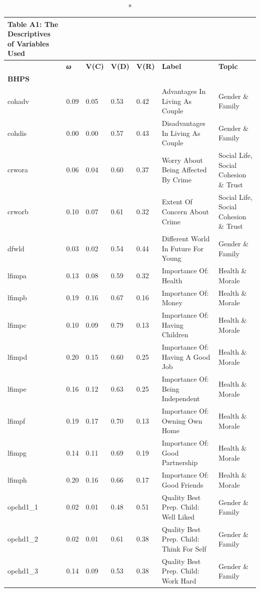\documentclass[
  12pt,
]{article}
\begin{document}
\begin{landscape}
\begin{scriptsize}
\begin{longtable}{|p{1.75in}|p{0.3in}|p{0.3in}|p{0.3in}|p{0.3in}|p{2.5in}|p{2.5in}}
\caption*{Table A1: The Descriptives of Variables Used}
\\
\toprule
\multicolumn{1}{l}{} & \emph{\textbf{ω}} & \textbf{V(C)} & \textbf{V(D)} & \textbf{V(R)} & \textbf{Label} & \textbf{Topic} \\ 
\midrule
\multicolumn{7}{l}{\textbf{BHPS}} \\ 
\midrule
cohadv & 0.09 & 0.05 & 0.53 & 0.42 & Advantages In Living As Couple & Gender \& Family \\ 
cohdis & 0.00 & 0.00 & 0.57 & 0.43 & Disadvantages In Living As Couple & Gender \& Family \\ 
crwora & 0.06 & 0.04 & 0.60 & 0.37 & Worry About Being Affected By Crime & Social Life, Social Cohesion \& Trust \\ 
crworb & 0.10 & 0.07 & 0.61 & 0.32 & Extent Of Concern About Crime & Social Life, Social Cohesion \& Trust \\ 
dfwld & 0.03 & 0.02 & 0.54 & 0.44 & Different World In Future For Young & Gender \& Family \\ 
lfimpa & 0.13 & 0.08 & 0.59 & 0.32 & Importance Of: Health & Health \& Morale \\ 
lfimpb & 0.19 & 0.16 & 0.67 & 0.16 & Importance Of: Money & Health \& Morale \\ 
lfimpc & 0.10 & 0.09 & 0.79 & 0.13 & Importance Of: Having Children & Health \& Morale \\ 
lfimpd & 0.20 & 0.15 & 0.60 & 0.25 & Importance Of: Having A Good Job & Health \& Morale \\ 
lfimpe & 0.16 & 0.12 & 0.63 & 0.25 & Importance Of: Being Independent & Health \& Morale \\ 
lfimpf & 0.19 & 0.17 & 0.70 & 0.13 & Importance Of: Owning Own Home & Health \& Morale \\ 
lfimpg & 0.14 & 0.11 & 0.69 & 0.19 & Importance Of: Good Partnership & Health \& Morale \\ 
lfimph & 0.20 & 0.16 & 0.66 & 0.17 & Importance Of: Good Friends & Health \& Morale \\ 
opchd1\_1 & 0.02 & 0.01 & 0.48 & 0.51 & Quality Best Prep. Child: Well Liked & Gender \& Family \\ 
opchd1\_2 & 0.02 & 0.01 & 0.61 & 0.38 & Quality Best Prep. Child: Think For Self & Gender \& Family \\ 
opchd1\_3 & 0.14 & 0.09 & 0.53 & 0.38 & Quality Best Prep. Child: Work Hard & Gender \& Family \\ 

\end{longtable}
\end{scriptsize}
\end{landscape}
\end{document}
